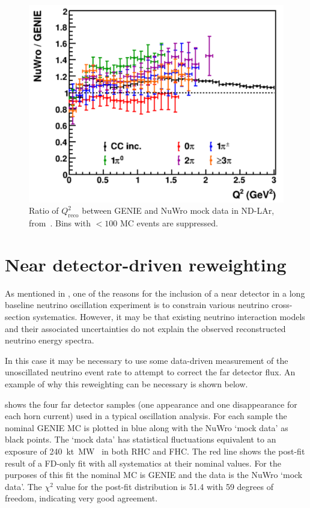 \begin{figure}[h]
	\centering
	\includegraphics[width=.6\linewidth]{files/figures/dune_ndrwt/larQ2Reco}
	\caption[Ratio of $Q^{2}_{\textrm{reco}}$ between GENIE and NuWro mock data in ND-LAr]{Ratio of $Q^{2}_{\textrm{reco}}$ between GENIE and NuWro mock data in ND-LAr, from~\cite{ndCdr}. Bins with $<100$ MC events are suppressed.}
	\label{fig:q2LarFhc}	
\end{figure}

\section{Near detector-driven reweighting}
\label{sec:dune_ndrwt:rwt}

As mentioned in , one of the reasons for the inclusion of a near detector in a long baseline neutrino oscillation experiment is to constrain various neutrino cross-section systematics.
However, it may be that existing neutrino interaction models and their associated uncertainties do not explain the observed reconstructed neutrino energy spectra.

In this case it may be necessary to use some data-driven measurement of the unoscillated neutrino event rate to attempt to correct the far detector flux.
An example of why this reweighting can be necessary is shown below. 

 shows the four far detector samples (one appearance and one disappearance for each horn current) used in a typical oscillation analysis.
For each sample the nominal GENIE MC is plotted in blue along with the NuWro `mock data' as black points.
The `mock data' has statistical fluctuations equivalent to an exposure of \SI{240}{\kilo\tonne\mega\watt\year} in both RHC and FHC.
The red line shows the post-fit result of a FD-only fit with all systematics at their nominal values. 
For the purposes of this fit the nominal MC is GENIE and the data is the NuWro `mock data'.
The $\chi^{2}$ value for the post-fit distribution is 51.4 with 59 degrees of freedom, indicating very good agreement.

